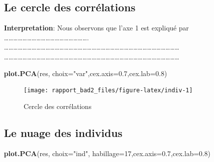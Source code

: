\documentclass[
]{article}
\newenvironment{Shaded}{\begin{snugshade}}{\end{snugshade}}
\newcommand{\DataTypeTok}[1]{\textcolor[rgb]{0.13,0.29,0.53}{#1}}
\newcommand{\DecValTok}[1]{\textcolor[rgb]{0.00,0.00,0.81}{#1}}
\newcommand{\FloatTok}[1]{\textcolor[rgb]{0.00,0.00,0.81}{#1}}
\newcommand{\KeywordTok}[1]{\textcolor[rgb]{0.13,0.29,0.53}{\textbf{#1}}}
\newcommand{\NormalTok}[1]{#1}
\newcommand{\StringTok}[1]{\textcolor[rgb]{0.31,0.60,0.02}{#1}}
\begin{document}
\hypertarget{le-cercle-des-corruxe9lations}{%
\subsection{\texorpdfstring{\textbf{Le cercle des
corrélations}}{Le cercle des corrélations}}\label{le-cercle-des-corruxe9lations}}

\textbf{Interpretation}: Nous observons que l'axe 1 est expliqué par
\ldots\ldots\ldots\ldots\ldots\ldots\ldots\ldots\ldots\ldots\ldots\ldots\ldots\ldots\ldots\ldots\ldots\ldots.\\
\ldots\ldots\ldots\ldots\ldots\ldots\ldots\ldots\ldots\ldots\ldots\ldots\ldots\ldots\ldots\ldots\ldots\ldots\ldots\ldots\ldots\ldots\ldots\ldots\ldots\ldots\ldots\ldots\ldots\ldots\ldots\ldots\ldots\ldots\ldots\ldots\ldots\ldots{}
\ldots\ldots\ldots\ldots\ldots\ldots\ldots\ldots\ldots\ldots\ldots\ldots\ldots\ldots\ldots\ldots\ldots\ldots\ldots\ldots\ldots\ldots\ldots\ldots\ldots\ldots\ldots\ldots\ldots\ldots\ldots\ldots\ldots\ldots\ldots\ldots\ldots\ldots{}

\begin{Shaded}
\begin{Highlighting}[]
\KeywordTok{plot.PCA}\NormalTok{(res, }\DataTypeTok{choix=}\StringTok{"var"}\NormalTok{,}\DataTypeTok{cex.axis=}\FloatTok{0.7}\NormalTok{,}\DataTypeTok{cex.lab=}\FloatTok{0.8}\NormalTok{)}
\end{Highlighting}
\end{Shaded}

\begin{figure}[h]

{\centering \texttt{[image: rapport\_bad2\_files/figure-latex/indiv-1]} 

}

\caption{Cercle des corrélations}\label{fig:indiv}
\end{figure}

\hypertarget{le-nuage-des-individus}{%
\subsection{\texorpdfstring{\textbf{Le nuage des
individus}}{Le nuage des individus}}\label{le-nuage-des-individus}}

\begin{Shaded}
\begin{Highlighting}[]
\KeywordTok{plot.PCA}\NormalTok{(res, }\DataTypeTok{choix=}\StringTok{"ind"}\NormalTok{, }\DataTypeTok{habillage=}\DecValTok{17}\NormalTok{,}\DataTypeTok{cex.axis=}\FloatTok{0.7}\NormalTok{,}\DataTypeTok{cex.lab=}\FloatTok{0.8}\NormalTok{)}
\end{Highlighting}
\end{Shaded}
\end{document}
